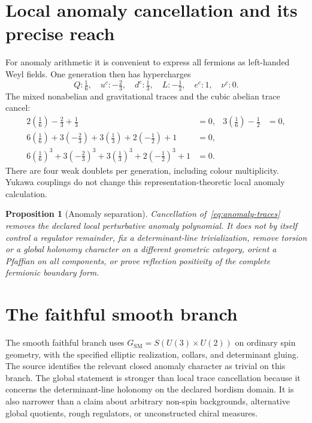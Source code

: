 \documentclass[11pt,a4paper,oneside]{book}
\theoremstyle{plain}
\newtheorem{proposition}[theorem]{Proposition}
\theoremstyle{definition}
\theoremstyle{remark}
\newcommand{\GSM}{G_{\mathrm{SM}}}
\newcommand{\src}[2]{\cite{#1}}
\begin{document}
\section{Local anomaly cancellation and its precise reach}
For anomaly arithmetic it is convenient to express all fermions as left-handed Weyl fields. One generation then has hypercharges
\begin{equation}
 Q:\tfrac16,\quad u^c:-\tfrac23,\quad d^c:\tfrac13,
 \quad L:-\tfrac12,\quad e^c:1,\quad\nu^c:0.
\end{equation}
The mixed nonabelian and gravitational traces and the cubic abelian trace cancel:
\begin{align}
 2\left(\tfrac16\right)-\tfrac23+\tfrac13&=0,
 &3\left(\tfrac16\right)-\tfrac12&=0,\\
 6\left(\tfrac16\right)+3\left(-\tfrac23\right)+3\left(\tfrac13\right)
 +2\left(-\tfrac12\right)+1&=0,\\
 6\left(\tfrac16\right)^3+3\left(-\tfrac23\right)^3
 +3\left(\tfrac13\right)^3+2\left(-\tfrac12\right)^3+1&=0.
 \label{eq:anomaly-traces}
\end{align}
There are four weak doublets per generation, including colour multiplicity. Yukawa couplings do not change this representation-theoretic local anomaly calculation. \src{R1}{cor:V138-local-cancellation,cor:V138-Yukawa-independence}

\begin{proposition}[Anomaly separation]
\label{prop:anomaly-separation}
Cancellation of~\eqref{eq:anomaly-traces} removes the declared local perturbative anomaly polynomial. It does not by itself control a regulator remainder, fix a determinant-line trivialization, remove torsion or a global holonomy character on a different geometric category, orient a Pfaffian on all components, or prove reflection positivity of the complete fermionic boundary form.
\end{proposition}
\src{R18}{led:v18v1-anomaly}

\section{The faithful smooth branch}
The smooth faithful branch uses $\GSM=S(U(3)\times U(2))$ on ordinary spin geometry, with the specified elliptic realization, collars, and determinant gluing. The source identifies the relevant closed anomaly character as trivial on this branch. The global statement is stronger than local trace cancellation because it concerns the determinant-line holonomy on the declared bordism domain. It is also narrower than a claim about arbitrary non-spin backgrounds, alternative global quotients, rough regulators, or unconstructed chiral measures. \src{R1}{thm:V141-closed-anomaly-zero}
\end{document}
